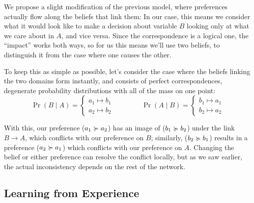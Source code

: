 \documentclass{article}
\begin{document}
	We propose a slight modification of the previous model, where preferences actually flow along the beliefs that link them: In our case, this means we consider what it would look like to make a decision about variable $B$ looking only at what we care about in $A$, and vice versa. Since the correspondence is a logical one, the ``impact'' works both ways, so for us this means we'll use two beliefs, to distinguish it from the case where one causes the other.
	
	\begin{center}
	\end{center}


	To keep this as simple as possible, let's consider the case where the beliefs linking the two domains form instantly, and consists of perfect correspondences, degenerate probability distributions with all of the mass on one point:
	\[ \Pr(B \mid A) = \begin{cases} a_1 \mapsto b_1\\ a_2 \mapsto b_2 \end{cases} \qquad\qquad
	   \Pr(A \mid B) = \begin{cases} b_1 \mapsto a_1\\ b_2 \mapsto a_2 \end{cases} \]
	
	With this, our preference ($a_1 \succcurlyeq a_2$) has an image of ($b_1 \succcurlyeq b_2$) under the link $B \to A$, which conflicts with our preference on $B$; similarly, ($b_2 \succcurlyeq b_1$) results in a preference ($a_2 \succcurlyeq a_1$) which conflicts with our preference on $A$. Changing the belief or either preference can resolve the conflict locally, but as we saw earlier, the actual inconsistency depends on the rest of the network. 
	
	
	
	
	
	
	\subsection{Learning from Experience}
	
\end{document}
